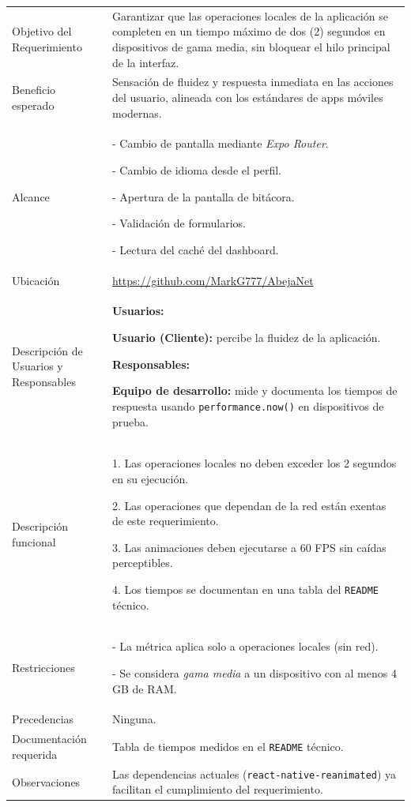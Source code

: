\noindent
\begin{tabular}{|p{4.5cm}|p{11cm}|}
\hline
\rowcolor{secVerde}\multicolumn{2}{|l|}{\color{white}\textbf{3. DESCRIPCIÓN DEL REQUERIMIENTO}} \\
\hline
Objetivo del Requerimiento &
Garantizar que las operaciones locales de la aplicación se completen en un tiempo máximo de dos (2) segundos en dispositivos de gama media, sin bloquear el hilo principal de la interfaz. \\
\hline
Beneficio esperado &
Sensación de fluidez y respuesta inmediata en las acciones del usuario, alineada con los estándares de apps móviles modernas. \\
\hline
Alcance &
- Cambio de pantalla mediante \textit{Expo Router}. \par
- Cambio de idioma desde el perfil. \par
- Apertura de la pantalla de bitácora. \par
- Validación de formularios. \par
- Lectura del caché del dashboard. \\
\hline
Ubicación & \url{https://github.com/MarkG777/AbejaNet} \\ \hline
Descripción de Usuarios y Responsables &
\textbf{Usuarios:} \par
\textbf{Usuario (Cliente):} percibe la fluidez de la aplicación. \par
\vspace{0.1cm}
\textbf{Responsables:} \par
\textbf{Equipo de desarrollo:} mide y documenta los tiempos de respuesta usando \texttt{performance.now()} en dispositivos de prueba. \\
\hline
Descripción funcional &
1. Las operaciones locales no deben exceder los 2 segundos en su ejecución. \par
2. Las operaciones que dependan de la red están exentas de este requerimiento. \par
3. Las animaciones deben ejecutarse a 60 FPS sin caídas perceptibles. \par
4. Los tiempos se documentan en una tabla del \texttt{README} técnico. \\
\hline
Restricciones &
- La métrica aplica solo a operaciones locales (sin red). \par
- Se considera \textit{gama media} a un dispositivo con al menos 4 GB de RAM. \\
\hline
Precedencias & Ninguna. \\ \hline
Documentación requerida & Tabla de tiempos medidos en el \texttt{README} técnico. \\ \hline
Observaciones & Las dependencias actuales (\texttt{react-native-reanimated}) ya facilitan el cumplimiento del requerimiento. \\ \hline
\end{tabular}

